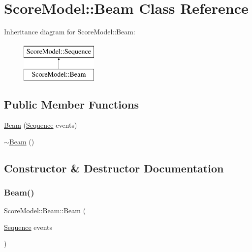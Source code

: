 \hypertarget{classScoreModel_1_1Beam}{}\section{Score\+Model\+::Beam Class Reference}
\label{classScoreModel_1_1Beam}
Inheritance diagram for Score\+Model\+::Beam\+:\begin{figure}[H]
\begin{center}
\leavevmode
\includegraphics[height=2.000000cm]{classScoreModel_1_1Beam}
\end{center}
\end{figure}
\subsection*{Public Member Functions}
\begin{DoxyCompactItemize}
\item 
\mbox{\hyperlink{classScoreModel_1_1Beam_a983aa843b90f43b083925125c35b73a6}{Beam}} (\mbox{\hyperlink{classScoreModel_1_1Sequence}{Sequence}} events)
\item 
\mbox{\hyperlink{classScoreModel_1_1Beam_a72812343b337c48ac06defe9ecd1bd34}{$\sim$\+Beam}} ()
\end{DoxyCompactItemize}


\subsection{Constructor \& Destructor Documentation}
\mbox{\label{classScoreModel_1_1Beam_a983aa843b90f43b083925125c35b73a6}} 
\subsubsection{\texorpdfstring{Beam()}{Beam()}}
{\footnotesize\ttfamily Score\+Model\+::\+Beam\+::\+Beam (\begin{DoxyParamCaption}\item[{\mbox{\hyperlink{classScoreModel_1_1Sequence}{Sequence}}}]{events }\end{DoxyParamCaption})}

